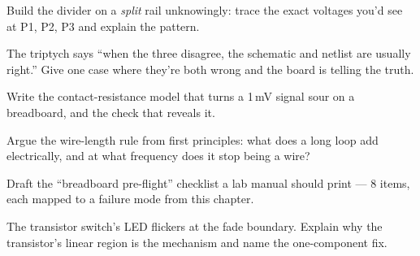 \begin{exercise}[hard]
Build the divider on a \emph{split} rail unknowingly: trace the
exact voltages you'd see at P1, P2, P3 and explain the pattern.
\end{exercise}
\begin{exercise}[hard]
The triptych says ``when the three disagree, the schematic and
netlist are usually right.'' Give one case where they're both wrong
and the board is telling the truth.
\end{exercise}
\begin{exercise}[hard]
Write the contact-resistance model that turns a 1\,mV signal sour
on a breadboard, and the check that reveals it.
\end{exercise}
\begin{exercise}[hard]
Argue the wire-length rule from first principles: what does a long
loop add electrically, and at what frequency does it stop being a
wire?
\end{exercise}
\begin{exercise}[hard]
Draft the ``breadboard pre-flight'' checklist a lab manual should
print --- 8 items, each mapped to a failure mode from this chapter.
\end{exercise}
\begin{exercise}[hard]
The transistor switch's LED flickers at the fade boundary. Explain
why the transistor's linear region is the mechanism and name the
one-component fix.
\end{exercise}

